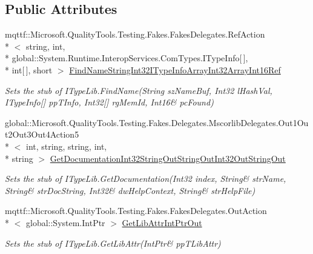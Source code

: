 \subsection*{Public Attributes}
\begin{DoxyCompactItemize}
\item 
mqttf\-::\-Microsoft.\-Quality\-Tools.\-Testing.\-Fakes.\-Fakes\-Delegates.\-Ref\-Action\\*
$<$ string, int, \\*
global\-::\-System.\-Runtime.\-Interop\-Services.\-Com\-Types.\-I\-Type\-Info\mbox{[}$\,$\mbox{]}, \\*
int\mbox{[}$\,$\mbox{]}, short $>$ \hyperlink{class_system_1_1_runtime_1_1_interop_services_1_1_com_types_1_1_fakes_1_1_stub_i_type_lib_aa4a66b372ce36caabce6353485048065}{Find\-Name\-String\-Int32\-I\-Type\-Info\-Array\-Int32\-Array\-Int16\-Ref}
\begin{DoxyCompactList}\small\item\em Sets the stub of I\-Type\-Lib.\-Find\-Name(String sz\-Name\-Buf, Int32 l\-Hash\-Val, I\-Type\-Info\mbox{[}\mbox{]} pp\-T\-Info, Int32\mbox{[}\mbox{]} rg\-Mem\-Id, Int16\& pc\-Found)\end{DoxyCompactList}\item 
global\-::\-Microsoft.\-Quality\-Tools.\-Testing.\-Fakes.\-Delegates.\-Mscorlib\-Delegates.\-Out1\-Out2\-Out3\-Out4\-Action5\\*
$<$ int, string, string, int, \\*
string $>$ \hyperlink{class_system_1_1_runtime_1_1_interop_services_1_1_com_types_1_1_fakes_1_1_stub_i_type_lib_afb14b8a2a94990de5f54e8634c211f06}{Get\-Documentation\-Int32\-String\-Out\-String\-Out\-Int32\-Out\-String\-Out}
\begin{DoxyCompactList}\small\item\em Sets the stub of I\-Type\-Lib.\-Get\-Documentation(Int32 index, String\& str\-Name, String\& str\-Doc\-String, Int32\& dw\-Help\-Context, String\& str\-Help\-File)\end{DoxyCompactList}\item 
mqttf\-::\-Microsoft.\-Quality\-Tools.\-Testing.\-Fakes.\-Fakes\-Delegates.\-Out\-Action\\*
$<$ global\-::\-System.\-Int\-Ptr $>$ \hyperlink{class_system_1_1_runtime_1_1_interop_services_1_1_com_types_1_1_fakes_1_1_stub_i_type_lib_ac3172485d87271b0dbc90a804d059602}{Get\-Lib\-Attr\-Int\-Ptr\-Out}
\begin{DoxyCompactList}\small\item\em Sets the stub of I\-Type\-Lib.\-Get\-Lib\-Attr(Int\-Ptr\& pp\-T\-Lib\-Attr)\end{DoxyCompactList}\item 

\end{DoxyCompactItemize}

